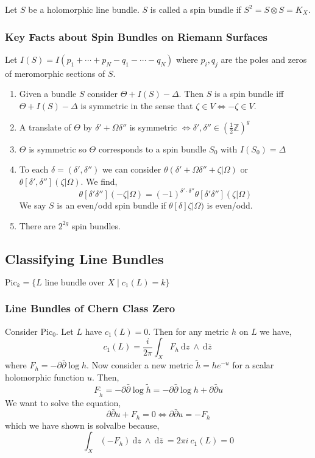 \documentclass[12pt]{extarticle}
\newcommand{\Z}{\mathbb{Z}}
\renewcommand{\d}[1]{\: \mathrm{d}#1 \:}
\theoremstyle{definition}
\newenvironment{definition}[1][Definition:]{\begin{trivlist}
\item[\hskip \labelsep {\bfseries #1}]}{\end{trivlist}}
\begin{document}
\begin{definition}
Let $S$ be a holomorphic line bundle. $S$ is called a spin bundle if $S^2 = S \otimes S = K_X$. 
\end{definition}

\subsubsection{Key Facts about Spin Bundles on Riemann Surfaces}

Let $I(S) = I(p_1 + \cdots + p_N - q_1 - \cdots - q_N)$ where $p_i, q_j$ are the poles and zeros of meromorphic sections of $S$.
\begin{enumerate}
\item Given a bundle $S$ consider $\Theta + I(S) - \Delta$. Then $S$ is a spin bundle iff $\Theta + I(S) - \Delta$ is symmetric in the sense that $\zeta \in V \iff -\zeta \in V$. 
\item A translate of $\Theta$ by $\delta' + \Omega \delta''$ is symmetric $\iff \delta' , \delta'' \in (\frac{1}{2} \Z)^g$
\item $\Theta$ is symmetric so $\Theta$ corresponds to a spin bundle $S_{0}$ with $I(S_{0}) = \Delta$
\item To each $\delta = (\delta', \delta'')$ we can consider $\theta(\delta' + \Omega \delta'' + \zeta | \Omega)$ or $\theta[\delta', \delta''](\zeta | \Omega)$. We find,
\[ \theta[\delta' \delta''](-\zeta | \Omega) = (-1)^{\delta' \cdot \delta''} \theta[\delta' \delta''](\zeta | \Omega) \]
We say $S$ is an even/odd spin bundle if $\theta[\delta]\zeta | \Omega)$ is even/odd.
\item There are $2^{2g}$ spin bundles.
\end{enumerate} 


\subsection{Classifying Line Bundles}

\newcommand{\Pic}[1]{\mathrm{Pic}_{#1}}

\begin{definition}
$\Pic{k} = \{ L \text{ line bundle over } X \mid c_1(L) = k \}$
\end{definition}

\subsubsection{Line Bundles of Chern Class Zero}

Consider $\Pic{0}$. Let $L$ have $c_1(L) = 0$. Then for any metric $h$ on $L$ we have,
\[ c_1(L) = \frac{i}{2 \pi} \int_X F_h \d{z} \wedge \d{\bar{z}} \]
where $F_h = - \partial \bar{\partial} \log{h}$. Now consider a new metric $\tilde{h} = h e^{-u}$ for a scalar holomorphic function $u$. Then,
\[ F_{\tilde{h}} = - \partial \bar{\partial} \log{\tilde{h}} = - \partial \bar{\partial} \log{h} + \partial \bar{\partial} u \]
We want to solve the equation,
\[ \partial \bar{\partial} u +  F_h = 0 \iff \partial \bar{\partial} u = - F_h \]
which we have shown is solvalbe because,
\[ \int_X (-F_h) \d{z} \wedge \d{\bar{z}} = 2 \pi i \: c_1(L) = 0 \]
\end{document}
